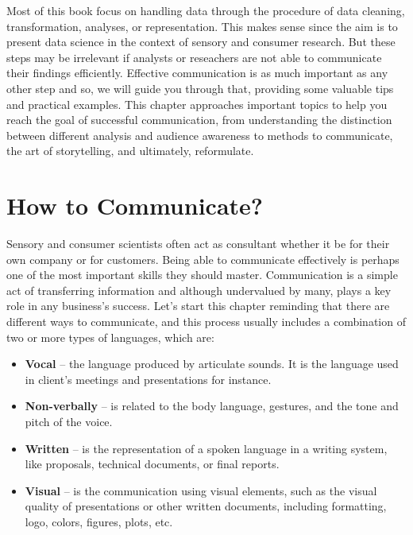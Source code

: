\documentclass[
]{krantz}
\providecommand{\tightlist}{%
  \setlength{\itemsep}{0pt}\setlength{\parskip}{0pt}}
\renewenvironment{quote}{\begin{VF}}{\end{VF}}
\begin{document}
\begin{quote}
Most of this book focus on handling data through the procedure of data cleaning, transformation, analyses, or representation. This makes sense since the aim is to present data science in the context of sensory and consumer research. But these steps may be irrelevant if analysts or reseachers are not able to communicate their findings efficiently. Effective communication is as much important as any other step and so, we will guide you through that, providing some valuable tips and practical examples. This chapter approaches important topics to help you reach the goal of successful communication, from understanding the distinction between different analysis and audience awareness to methods to communicate, the art of storytelling, and ultimately, reformulate.
\end{quote}

\hypertarget{how-to-communicate}{%
\section{How to Communicate?}\label{how-to-communicate}}

Sensory and consumer scientists often act as consultant whether it be for their own company or for customers. Being able to communicate effectively is perhaps one of the most important skills they should master. Communication is a simple act of transferring information and although undervalued by many, plays a key role in any business's success. Let's start this chapter reminding that there are different ways to communicate, and this process usually includes a combination of two or more types of languages, which are:

\begin{itemize}
\tightlist
\item
  \textbf{Vocal} -- the language produced by articulate sounds. It is the language used in client's meetings and presentations for instance.
\item
  \textbf{Non-verbally} -- is related to the body language, gestures, and the tone and pitch of the voice.
\item
  \textbf{Written} -- is the representation of a spoken language in a writing system, like proposals, technical documents, or final reports.
\item
  \textbf{Visual} -- is the communication using visual elements, such as the visual quality of presentations or other written documents, including formatting, logo, colors, figures, plots, etc.
\end{itemize}
\end{document}
